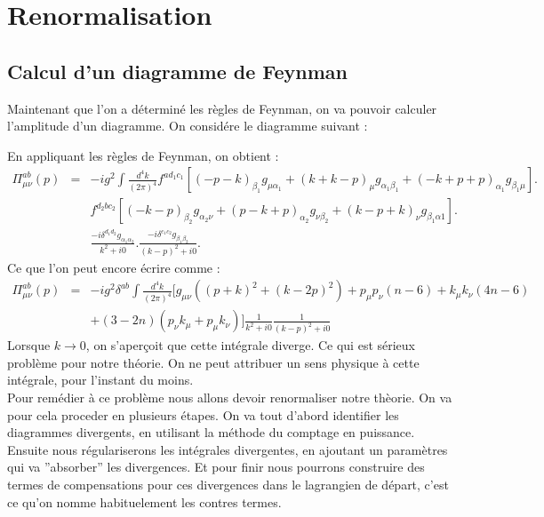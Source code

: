 \documentclass[a4paper,11pt]{article} %
\theoremstyle{plain}
\theoremstyle{definition}
\theoremstyle{remark}
\numberwithin{equation}{section}
\numberwithin{equation}{subsection}
\numberwithin{figure}{section}
\begin{document}
\section{Renormalisation}

  \subsection{Calcul d'un diagramme de Feynman}


\noindent
Maintenant que l'on a déterminé les règles de Feynman, on va pouvoir calculer l'amplitude d'un diagramme. On considére le diagramme suivant :


\noindent
En appliquant les règles de Feynman, on obtient :
\begin{eqnarray*}
 \Pi^{ab}_{\mu\nu}(p) &=& - i g^{2}  \int \frac{d^{4}k}{\left(2\pi\right)^4} f^{ad_{1}c_{1}} 
\left[(-p-k)_{\beta_{1}}g_{\mu\alpha_{1}}  +  (k+k-p)_{\mu}g_{\alpha_{1}\beta_{1}}  +  (-k+p+p)_{\alpha_{1}}g_{\beta_{1}\mu}  \right]. \nonumber \\
&& f^{d_{2}bc_{2}} \left[(-k-p)_{\beta_{2}}g_{\alpha_{2}\nu}  +  (p-k+p)_{\alpha_{2}}g_{\nu\beta_{2}}  
+  (k-p+k)_{\nu}g_{\beta_{1}\alpha{1}}  \right].\nonumber  \\
&& \frac{-i\delta^{d_{1}d_{2}}g_{\alpha_{1}\alpha_{2}}}{k^2+i0} . \frac{-i\delta^{c_{1}c_{2}}g_{\beta_{1}\beta_{2}}}{(k-p)^2+i0}  .
\end{eqnarray*}
Ce que l'on peut encore écrire comme :
\begin{eqnarray*}
 \Pi^{ab}_{\mu\nu}(p) &=&  - i g^{2}  \delta^{ab} \int \frac{d^{4}k}{\left(2\pi\right)^4} 
[g_{\mu\nu}\left((p+k)^{2} +(k-2p)^2\right) + p_{\mu}p_{\nu}\left(n-6\right)+k_{\mu}k_{\nu}\left(4n-6\right)  \nonumber  \\
&&  +(3-2n)(p_{\nu}k_{\mu}+p_{\mu}k_{\nu})]\frac{1}{k^2+i0}\frac{1}{(k-p)^2+i0}
\end{eqnarray*}
Lorsque $k \to 0$, on s'aperçoit que cette intégrale diverge. Ce qui est sérieux problème pour notre théorie. On ne peut attribuer un sens 
physique à cette intégrale, pour l'instant du moins.\\

\noindent
Pour remédier à ce problème nous allons devoir renormaliser notre thèorie. On va pour cela proceder en plusieurs étapes. On va tout d'abord 
identifier les diagrammes divergents, en utilisant la méthode du comptage en puissance. Ensuite nous régulariserons les intégrales divergentes, 
en ajoutant un paramètres qui va ''absorber'' les divergences. Et pour finir nous pourrons construire des termes de compensations pour ces 
divergences dans le lagrangien de départ, c'est ce qu'on nomme habituelement les contres termes.
\end{document}
